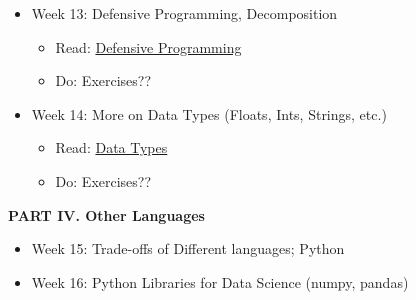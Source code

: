 \documentclass[12pt]{article}
\begin{document}
\begin{itemize}
	\item Week 13: Defensive Programming, Decomposition
		\begin{itemize}
			\item Read: \href{http://www.programming4ds.com/html/defensive_programming.html}{Defensive Programming}
			\item Do: Exercises??
		\end{itemize}


	\item Week 14: More on Data Types (Floats, Ints, Strings, etc.)
	\begin{itemize}
		\item Read: \href{http://www.programming4ds.com/html/data_types.html}{Data Types}
		\item Do: Exercises??
	\end{itemize}

\end{itemize}

\vspace{.4in}
\begin{center}
	\textbf{PART IV. Other Languages}
\end{center}
\vspace{.2in}

\begin{itemize}
	\item Week 15: Trade-offs of Different languages; Python
	\item Week 16: Python Libraries for Data Science (numpy, pandas)
\end{itemize}
\end{document}
